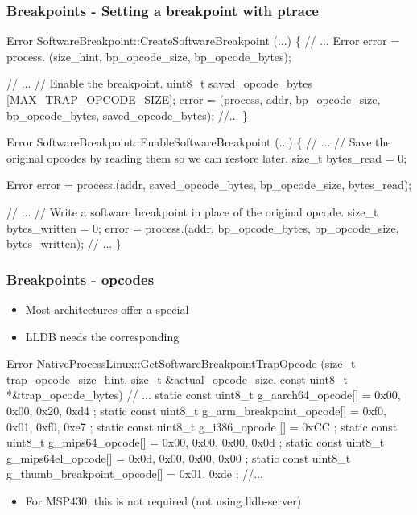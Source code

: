 \begin{frame}[fragile]
\frametitle{Breakpoints - Setting a breakpoint with ptrace}

\begin{codebox2}
Error
SoftwareBreakpoint::CreateSoftwareBreakpoint (...)
\{
    // ...
    Error error = process. (size_hint, bp_opcode_size, bp_opcode_bytes);

    // ...
    // Enable the breakpoint.
    uint8_t saved_opcode_bytes [MAX_TRAP_OPCODE_SIZE];
    error =  (process, addr, bp_opcode_size, bp_opcode_bytes, saved_opcode_bytes);
    //...
\}

Error
SoftwareBreakpoint::EnableSoftwareBreakpoint (...)
\{
    // ...
    // Save the original opcodes by reading them so we can restore later.
    size_t bytes_read = 0;

    Error error = process.(addr, saved_opcode_bytes, bp_opcode_size, bytes_read);
 
    // ...
    // Write a software breakpoint in place of the original opcode.
    size_t bytes_written = 0;
    error = process.(addr, bp_opcode_bytes, bp_opcode_size, bytes_written);
    // ...
\}
\end{codebox2}
\end{frame}


\begin{frame}[fragile]
\frametitle{Breakpoints - opcodes}
\begin{itemize}
    \item Most architectures offer a special 
    \item LLDB needs the corresponding 
\end{itemize}
\begin{codebox}
Error
NativeProcessLinux::GetSoftwareBreakpointTrapOpcode (size_t trap_opcode_size_hint,
                                                     size_t &actual_opcode_size,
                                                     const uint8_t *&trap_opcode_bytes)
{
    // ...
    static const uint8_t g_aarch64_opcode[] = { 0x00, 0x00, 0x20, 0xd4 };
    static const uint8_t g_arm_breakpoint_opcode[] = { 0xf0, 0x01, 0xf0, 0xe7 };
    static const uint8_t g_i386_opcode [] = { 0xCC };
    static const uint8_t g_mips64_opcode[] = { 0x00, 0x00, 0x00, 0x0d };
    static const uint8_t g_mips64el_opcode[] = { 0x0d, 0x00, 0x00, 0x00 };
    static const uint8_t g_thumb_breakpoint_opcode[] = { 0x01, 0xde };
    //...
}
\end{codebox}
\begin{itemize}
    \item For MSP430, this is not required (not using lldb-server)
\end{itemize}
\end{frame}

